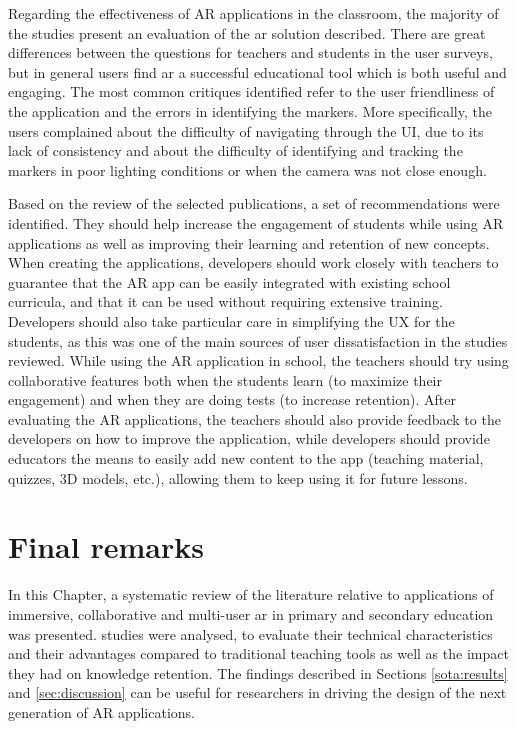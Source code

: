 Regarding the effectiveness of AR applications in the classroom, the majority of the studies present an evaluation of the \gls{ar} solution described. There are great differences between the questions for teachers and students in the user surveys, but in general users find \gls{ar} a successful educational tool which is both useful and engaging. The most common critiques identified refer to the user friendliness of the application and the errors in identifying the markers. More specifically, the users complained about the difficulty of navigating through the UI, due to its lack of consistency and about the difficulty of identifying and tracking the markers in poor lighting conditions or when the camera was not close enough.

Based on the review of the selected publications, a set of recommendations were identified. They should help increase the engagement of students while using AR applications as well as improving their learning and retention of new concepts. When creating the applications, developers should work closely with teachers to guarantee that the AR app can be easily integrated with existing school curricula, and that it can be used without requiring extensive training. Developers should also take particular care in simplifying the UX for the students, as this was one of the main sources of user dissatisfaction in the studies reviewed. While using the AR application in school, the teachers should try using collaborative features both when the students learn (to maximize their engagement) and when they are doing tests (to increase retention). After evaluating the AR applications, the teachers should also provide feedback to the developers on how to improve the application, while developers should provide educators the means to easily add new content to the app (teaching material, quizzes, 3D models, etc.), allowing them to keep using it for future lessons.

\section{Final remarks} \label{sota:conclusions}
In this Chapter, a systematic review of the literature relative to applications of immersive, collaborative and multi-user \gls{ar} in primary and secondary education was presented. \papersSelected studies were analysed, to evaluate their technical characteristics and their advantages compared to traditional teaching tools as well as the impact they had on knowledge retention. The findings described in Sections \ref{sota:results} and \ref{sec:discussion} can be useful for researchers in driving the design of the next generation of AR applications.

